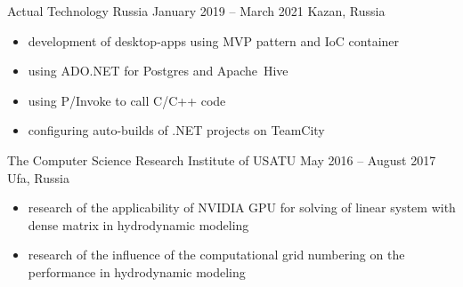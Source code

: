 \documentclass[10pt,a4paper,ragged2e,withhyper]{altacv}
\begin{document}

\makecvheader



\begin{paracol}{2}



{Actual Technology Russia}
{January 2019 -- March 2021}
{Kazan, Russia}

\begin{itemize}

  \item development of desktop-apps using MVP pattern and IoC container
  \smallskip

  \item using ADO.NET for Postgres and Apache~Hive
  \smallskip

  \item using P/Invoke to call C/C++ code
  \smallskip

  \item configuring auto-builds of .NET projects on TeamCity

\end{itemize}

\divider

{The Computer Science Research Institute of USATU}
{May 2016 -- August 2017}
{Ufa, Russia}

\begin{itemize}

  \item research of the applicability of NVIDIA GPU for
  solving of linear system with dense matrix in hydrodynamic modeling
  \smallskip

  \item research of the influence of the computational grid numbering
  \newline on the performance in hydrodynamic modeling
  \smallskip


\end{itemize}
\end{paracol}
\end{document}
